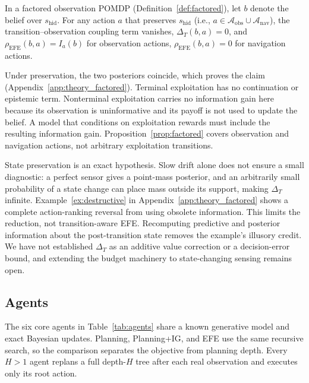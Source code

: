 \begin{proposition}
\label{prop:factored}
In a factored observation POMDP (Definition~\ref{def:factored}), let $b$ denote the belief over $s_{\mathrm{hid}}$. For any action $a$ that preserves $s_{\mathrm{hid}}$ (i.e., $a \in \mathcal{A}_{\mathrm{obs}} \cup \mathcal{A}_{\mathrm{nav}}$), the transition--observation coupling term vanishes, $\Delta_T(b, a) = 0$, and $\rho_{\mathrm{EFE}}(b, a) = I_a(b)$ for observation actions, $\rho_{\mathrm{EFE}}(b, a) = 0$ for navigation actions.
\end{proposition}

Under preservation, the two posteriors coincide, which proves the claim (Appendix~\ref{app:theory_factored}). Terminal exploitation has no continuation or epistemic term. Nonterminal exploitation carries no information gain here because its observation is uninformative and its payoff is not used to update the belief. A model that conditions on exploitation rewards must include the resulting information gain. Proposition~\ref{prop:factored} covers observation and navigation actions, not arbitrary exploitation transitions.

State preservation is an exact hypothesis. Slow drift alone does not ensure a small diagnostic: a perfect sensor gives a point-mass posterior, and an arbitrarily small probability of a state change can place mass outside its support, making $\Delta_T$ infinite. Example~\ref{ex:destructive} in Appendix~\ref{app:theory_factored} shows a complete action-ranking reversal from using obsolete information. This limits the reduction, not transition-aware EFE. Recomputing predictive and posterior information about the post-transition state removes the example's illusory credit. We have not established $\Delta_T$ as an additive value correction or a decision-error bound, and extending the budget machinery to state-changing sensing remains open.

\subsection{Agents}

The six core agents in Table~\ref{tab:agents} share a known generative model and exact Bayesian updates. Planning, Planning+IG, and EFE use the same recursive search, so the comparison separates the objective from planning depth. Every $H>1$ agent replans a full depth-$H$ tree after each real observation and executes only its root action.

